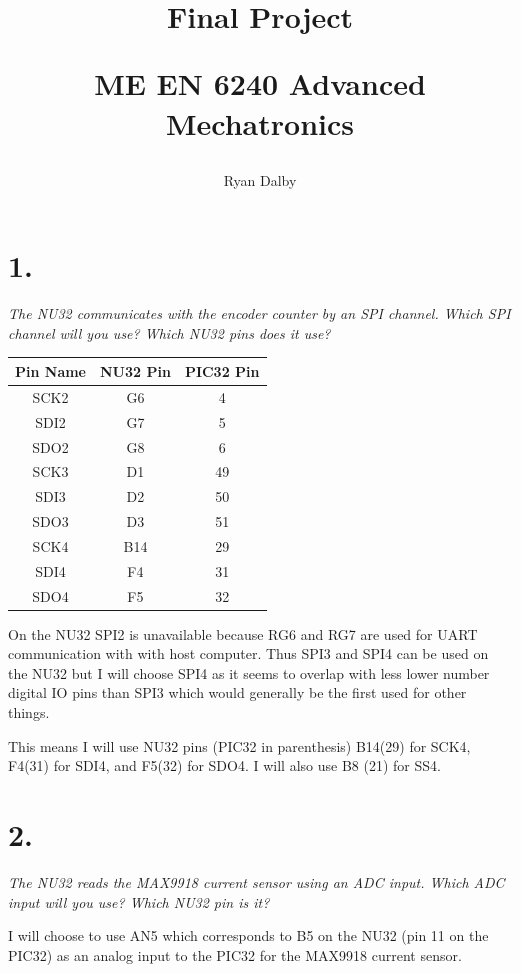 \documentclass[12pt]{article}
\title{
    Final Project

    \large{
        ME EN 6240 Advanced Mechatronics
    }  
}
\author{
        Ryan Dalby
}
\date{\displaydate{date}}
\begin{document}
\maketitle

\section*{1.}
\textit{The NU32 communicates with the encoder counter by an SPI channel. Which SPI channel will you use? Which NU32 pins does it use?}

\begin{center}
\begin{tabular}{|c|c|c|}
    \hline
    Pin Name & NU32 Pin & PIC32 Pin \\
    \hline
    SCK2 & G6 & 4\\
    SDI2 & G7 & 5\\
    SDO2 & G8 & 6\\
    \hline
    SCK3 & D1 & 49\\
    SDI3 & D2 & 50\\
    SDO3 & D3 & 51\\
    \hline
    SCK4 & B14 & 29\\
    SDI4 & F4 & 31\\
    SDO4 & F5 & 32\\
    \hline
\end{tabular}
\end{center}

On the NU32 SPI2 is unavailable because RG6 and RG7 are used for UART communication with with host computer.
Thus SPI3 and SPI4 can be used on the NU32 but I will choose SPI4 as it seems to overlap with less lower number digital IO pins than SPI3 which would generally be the first used for other things.

This means I will use NU32 pins (PIC32 in parenthesis) B14(29) for SCK4, F4(31) for SDI4, and F5(32) for SDO4. 
I will also use B8 (21) for SS4.

\section*{2.}
\textit{The NU32 reads the MAX9918 current sensor using an ADC input. Which ADC input will you use? Which NU32 pin is it?}

I will choose to use AN5 which corresponds to B5 on the NU32 (pin 11 on the PIC32) as an analog input to the PIC32 for the MAX9918 current sensor.
\end{document}
